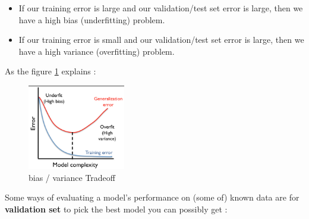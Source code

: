 \begin{itemize}
\item If our training error is large and our validation/test set error is large, then we have a high bias (underfitting) problem.
\item If our training error is small and our validation/test set error is large, then we have a high variance (overfitting) problem.
\end{itemize}
As the figure \ref{fig:bias} explains : 
\begin{figure}[H]
\centering
\includegraphics[width=0.38\textwidth]{img/model.png}
\caption{ bias / variance Tradeoff}
\label{fig:bias}
\end{figure}
Some ways of evaluating a model's performance on (some of)  known data are for \textbf{validation set } to pick  the best model you can possibly get :
